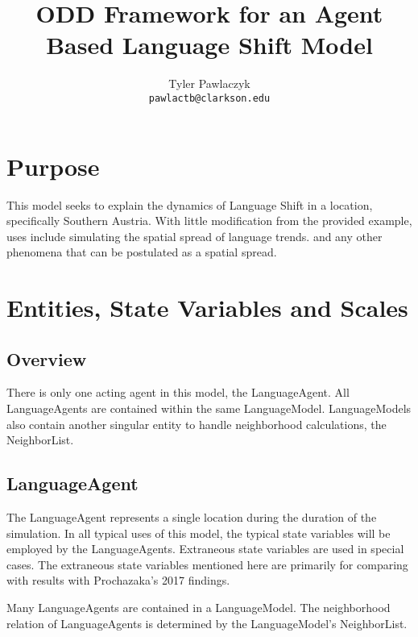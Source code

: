 \documentclass{article}
\title{ODD Framework for an Agent Based  Language Shift Model}
\author{Tyler Pawlaczyk \\ \texttt{pawlactb@clarkson.edu}}
\begin{document}
\maketitle

\section{Purpose}
This model seeks to explain the dynamics of Language Shift in a location, specifically Southern Austria. With little modification from the provided example, uses include simulating the spatial spread of language trends.  and any other phenomena that can be postulated as a spatial spread.

\section{Entities, State Variables and Scales}
\subsection{Overview}
There is only one acting agent in this model, the LanguageAgent. All LanguageAgents are contained within the same LanguageModel. LanguageModels also contain another singular entity to handle neighborhood calculations, the NeighborList.

\subsection{LanguageAgent}

The LanguageAgent represents a single location during the duration of the simulation. In all typical uses of this model, the typical state variables will be employed by the LanguageAgents. Extraneous state variables are used in special cases. The extraneous state variables mentioned here are primarily for comparing with results with Prochazaka's 2017 findings.

Many LanguageAgents are contained in a LanguageModel. The neighborhood relation of LanguageAgents is determined by the LanguageModel's NeighborList.
\end{document}
